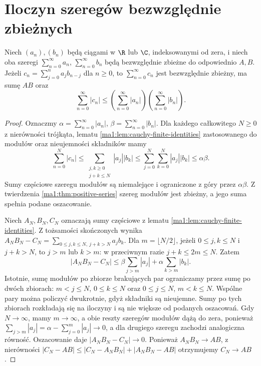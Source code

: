 \section{Iloczyn szeregów bezwzględnie zbieżnych}
\begin{twierdzenie}
\label{ma1:thm:absolute-cauchy-product}
Niech $(a_n),(b_n)$ będą ciągami w $\R$ lub $\C$, indeksowanymi od zera, i niech oba szeregi $\sum_{n=0}^\infty a_n$, $\sum_{n=0}^\infty b_n$ będą bezwzględnie zbieżne do odpowiednio $A,B$. Jeżeli $c_n=\sum_{j=0}^n a_jb_{n-j}$ dla $n\ge0$, to $\sum_{n=0}^\infty c_n$ jest bezwzględnie zbieżny, ma sumę $AB$ oraz
\[
 \sum_{n=0}^\infty |c_n|
 \le \left(\sum_{n=0}^\infty |a_n|\right)
      \left(\sum_{n=0}^\infty |b_n|\right).
\]
\end{twierdzenie}
\begin{proof}
Oznaczmy $\alpha=\sum_{n=0}^\infty|a_n|$, $\beta=\sum_{n=0}^\infty|b_n|$. Dla każdego całkowitego $N\ge0$ z nierówności trójkąta, lematu \ref{ma1:lem:cauchy-finite-identities} zastosowanego do modułów oraz nieujemności składników mamy
\[
 \sum_{n=0}^N|c_n|\le
 \sum_{\substack{j,k\ge0\\j+k\le N}}|a_j||b_k|
 \le \sum_{j=0}^N\sum_{k=0}^N |a_j||b_k|
 \le\alpha\beta.
\]
Sumy częściowe szeregu modułów są niemalejące i ograniczone z góry przez $\alpha\beta$. Z twierdzenia \ref{ma1:thm:positive-series} szereg modułów jest zbieżny, a jego suma spełnia podane oszacowanie.

Niech $A_N,B_N,C_N$ oznaczają sumy częściowe z lematu \ref{ma1:lem:cauchy-finite-identities}. Z tożsamości skończonych wynika $A_NB_N-C_N=\sum_{0\le j,k\le N,\ j+k>N}a_jb_k$. Dla $m=\lfloor N/2\rfloor$, jeżeli $0\le j,k\le N$ i $j+k>N$, to $j>m$ lub $k>m$: w przeciwnym razie $j+k\le2m\le N$. Zatem
\[
 |A_NB_N-C_N|
 \le \beta\sum_{j>m}|a_j|+
      \alpha\sum_{k>m}|b_k|.
\]
Istotnie, sumę modułów po zbiorze brakujących par ograniczamy przez sumę po dwóch zbiorach: $m<j\le N$, $0\le k\le N$ oraz $0\le j\le N$, $m<k\le N$. Wspólne pary można policzyć dwukrotnie, gdyż składniki są nieujemne. Sumy po tych zbiorach rozkładają się na iloczyny i są nie większe od podanych oszacowań. Gdy $N\to\infty$, mamy $m\to\infty$, a obie reszty szeregów modułów dążą do zera, ponieważ $\sum_{j>m}|a_j|=\alpha-\sum_{j=0}^{m}|a_j|\to0$, a dla drugiego szeregu zachodzi analogiczna równość. Oszacowanie daje $|A_NB_N-C_N|\to0$. Ponieważ $A_NB_N\to AB$, z nierówności $|C_N-AB|\le |C_N-A_NB_N|+|A_NB_N-AB|$ otrzymujemy $C_N\to AB$.
\end{proof}

